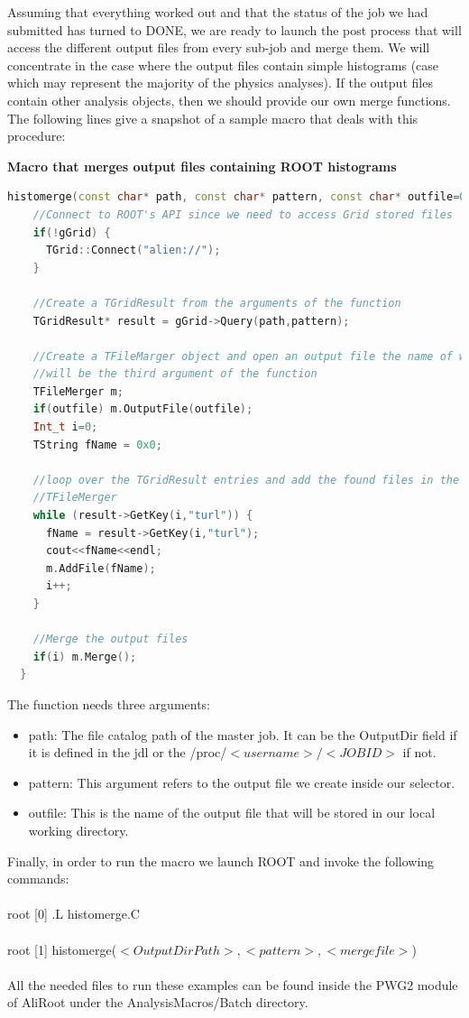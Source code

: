 Assuming that everything worked out and that the status of the job we had submitted has turned to {\ttfamily DONE}, we are ready to launch the post process that will access the different output files from every sub-job and merge them. We will concentrate in the case where the output files contain simple histograms (case which may represent the majority of the physics analyses). If the output files contain other analysis objects, then we should provide our own merge functions. The following lines give a snapshot of a sample macro that deals with this procedure:

\vspace{0.5 cm}
\textbf{Macro that merges output files containing ROOT histograms}
\begin{lstlisting}[language=C++]
  histomerge(const char* path, const char* pattern, const char* outfile=0){
    //Connect to ROOT's API since we need to access Grid stored files
    if(!gGrid) {
      TGrid::Connect("alien://");
    }
    
    //Create a TGridResult from the arguments of the function
    TGridResult* result = gGrid->Query(path,pattern);

    //Create a TFileMarger object and open an output file the name of which 
    //will be the third argument of the function
    TFileMerger m;
    if(outfile) m.OutputFile(outfile);
    Int_t i=0;
    TString fName = 0x0;

    //loop over the TGridResult entries and add the found files in the 
    //TFileMerger
    while (result->GetKey(i,"turl")) {
      fName = result->GetKey(i,"turl");
      cout<<fName<<endl;
      m.AddFile(fName);
      i++;
    }

    //Merge the output files
    if(i) m.Merge();
  }
\end{lstlisting}

The function needs three arguments:

\begin{itemize}
\item {\ttfamily path:} The file catalog path of the master job. It can be the {\ttfamily OutputDir} field if it is defined in the jdl or the {\ttfamily /proc/$<username>/<JOBID>$} if not.
\item {\ttfamily pattern:} This argument refers to the output file we create inside our selector.
\item {\ttfamily outfile:} This is the name of the output file that will be stored in our local working directory.
\end{itemize}

Finally, in order to run the macro we launch ROOT and invoke the following commands: \\
\\
{\ttfamily root [0] .L histomerge.C}\\
\\
{\ttfamily root [1] histomerge($<OutputDirPath>,<pattern>,<mergefile>$)}\\
\\

All the needed files to run these examples can be found inside the PWG2 module of AliRoot under the AnalysisMacros/Batch directory.

